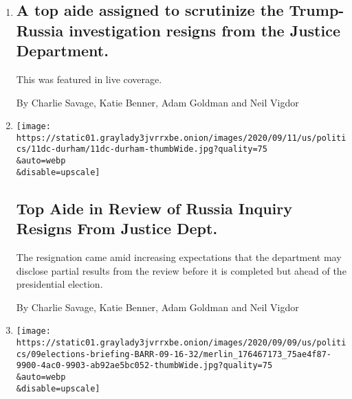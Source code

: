 \begin{enumerate}
\def\labelenumi{\arabic{enumi}.}
\item
  \href{/live/2020/09/11/us/trump-vs-biden/a-top-aide-assigned-to-scrutinize-the-trump-russia-investigation-resigns-from-the-justice-department}{}

  \hypertarget{a-top-aide-assigned-to-scrutinize-the-trump-russia-investigation-resigns-from-the-justice-department}{%
  \subsection{A top aide assigned to scrutinize the Trump-Russia
  investigation resigns from the Justice
  Department.}\label{a-top-aide-assigned-to-scrutinize-the-trump-russia-investigation-resigns-from-the-justice-department}}

  This was featured in live coverage.

  By Charlie Savage, Katie Benner, Adam Goldman and Neil Vigdor
\item
  \href{/2020/09/11/us/politics/nora-dannehy-durham-russia-investigation.html}{}

  \texttt{[image: https://static01.graylady3jvrrxbe.onion/images/2020/09/11/us/politics/11dc-durham/11dc-durham-thumbWide.jpg?quality=75\\\&auto=webp\\\&disable=upscale]}

  \hypertarget{top-aide-in-review-of-russia-inquiry-resigns-from-justice-dept}{%
  \subsection{Top Aide in Review of Russia Inquiry Resigns From Justice
  Dept.}\label{top-aide-in-review-of-russia-inquiry-resigns-from-justice-dept}}

  The resignation came amid increasing expectations that the department
  may disclose partial results from the review before it is completed
  but ahead of the presidential election.

  By Charlie Savage, Katie Benner, Adam Goldman and Neil Vigdor
\item
  \href{/2020/09/09/us/elections/barr-says-its-normal-for-the-justice-dept-to-defend-the-president-in-a-defamation-suit.html}{}

  \texttt{[image: https://static01.graylady3jvrrxbe.onion/images/2020/09/09/us/politics/09elections-briefing-BARR-09-16-32/merlin\_176467173\_75ae4f87-9900-4ac0-9903-ab92ae5bc052-thumbWide.jpg?quality=75\\\&auto=webp\\\&disable=upscale]}


\end{enumerate}
